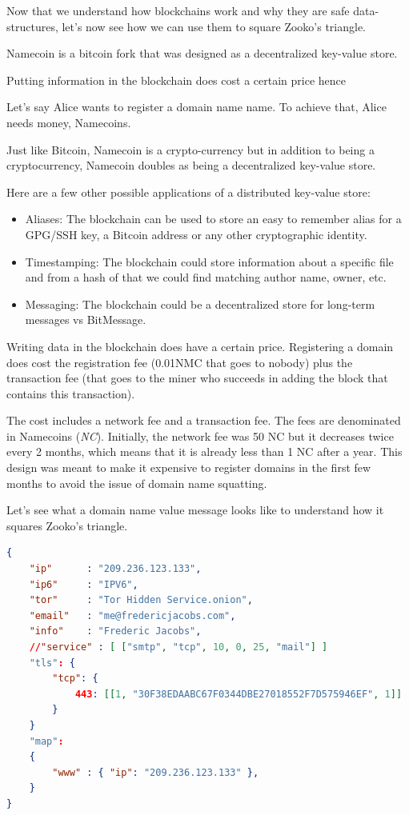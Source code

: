 \documentclass{vldb}
\begin{document}
Now that we understand how blockchains work and why they are safe data-structures, let's now see how we can use them to square Zooko's triangle. 

Namecoin is a bitcoin fork that was designed as a decentralized key-value store.

Putting information in the blockchain does cost a certain price hence

Let's say Alice wants to register a domain name name. To achieve that, Alice needs money, Namecoins.  

Just like Bitcoin, Namecoin is a crypto-currency but in addition to being a cryptocurrency, Namecoin doubles as being a decentralized key-value store.

Here are a few other possible applications of a distributed key-value store:
\begin{itemize}
\item Aliases: The blockchain can be used to store an easy to remember alias for a GPG/SSH key, a Bitcoin address or any other cryptographic identity.
\item Timestamping: The blockchain could store information about a specific file and from a hash of that we could find matching author name, owner, etc.
\item Messaging: The blockchain could be a decentralized store for  long-term messages vs BitMessage.
\end{itemize}

Writing data in the blockchain does have a certain price. Registering a domain does cost the registration fee (0.01NMC that goes to nobody) plus the transaction fee (that goes to the miner who succeeds in adding the block that contains this transaction).

The cost includes a network fee and a transaction fee. The fees are denominated in Namecoins (\emph{NC}). Initially, the network fee was 50 NC but it decreases twice every 2 months, which means that it is already less than 1 NC after a year. This design was meant to make it expensive to register domains in the first few months to avoid the issue of domain name squatting.

Let's see what a domain name value message looks like to understand how it squares Zooko's triangle.

\begin{lstlisting}[language=json,firstnumber=1]
{
    "ip"      : "209.236.123.133",
    "ip6"     : "IPV6",
    "tor"     : "Tor Hidden Service.onion",
    "email"   : "me@fredericjacobs.com",
    "info"    : "Frederic Jacobs",
    //"service" : [ ["smtp", "tcp", 10, 0, 25, "mail"] ]
    "tls": {
        "tcp": {
            443: [[1, "30F38EDAABC67F0344DBE27018552F7D575946EF", 1]]
        }
    }
    "map":
    {
        "www" : { "ip": "209.236.123.133" },
    }
}
\end{lstlisting}
\end{document}
